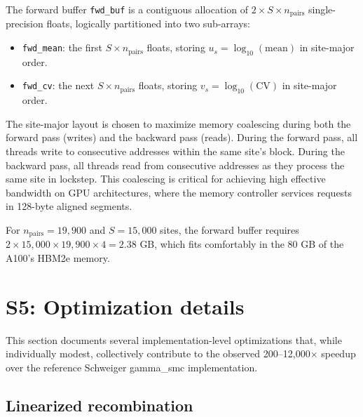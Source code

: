 \documentclass[10pt,letterpaper]{article}
\begin{document}
The forward buffer \texttt{fwd\_buf} is a contiguous allocation of $2 \times S \times n_{\mathrm{pairs}}$ single-precision floats, logically partitioned into two sub-arrays:
\begin{itemize}
\item \texttt{fwd\_mean}: the first $S \times n_{\mathrm{pairs}}$ floats, storing $u_s = \log_{10}(\text{mean})$ in site-major order.
\item \texttt{fwd\_cv}: the next $S \times n_{\mathrm{pairs}}$ floats, storing $v_s = \log_{10}(\text{CV})$ in site-major order.
\end{itemize}
The site-major layout is chosen to maximize memory coalescing during both the forward pass (writes) and the backward pass (reads). During the forward pass, all threads write to consecutive addresses within the same site's block. During the backward pass, all threads read from consecutive addresses as they process the same site in lockstep. This coalescing is critical for achieving high effective bandwidth on GPU architectures, where the memory controller services requests in 128-byte aligned segments.

For $n_{\mathrm{pairs}} = 19{,}900$ and $S = 15{,}000$ sites, the forward buffer requires $2 \times 15{,}000 \times 19{,}900 \times 4 = 2.38$ GB, which fits comfortably in the 80 GB of the A100's HBM2e memory.


\section{S5: Optimization details}

This section documents several implementation-level optimizations that, while individually modest, collectively contribute to the observed 200--12{,}000$\times$ speedup over the reference Schweiger gamma\_smc implementation.

\subsection{Linearized recombination}
\end{document}
